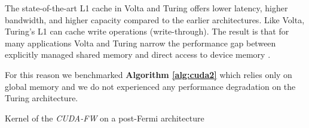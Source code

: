 The state-of-the-art L1 cache in Volta and Turing offers lower latency, higher bandwidth, and higher capacity compared to the earlier architectures. Like Volta, Turing's L1 can cache write operations (write-through). The result is that for many applications Volta and Turing narrow the performance gap between explicitly managed shared memory and direct access to device memory \cite{nvidia}. \par
For this reason we benchmarked \textbf{Algorithm \ref*{alg:cuda2}} which relies only on global memory and we do not experienced any performance degradation on the Turing architecture.



\begin{algorithm}[h!]

\SetAlgoLined

\DontPrintSemicolon
 
\caption{Kernel of the \emph{CUDA-FW} on a post-Fermi architecture}\label{alg:cuda2}
\end{algorithm}

